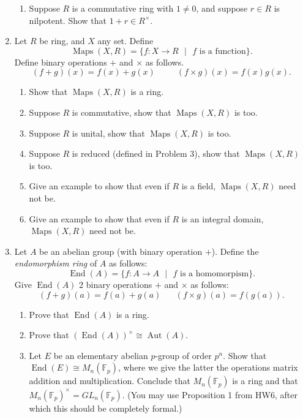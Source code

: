 \documentclass[11pt]{article}
\newcommand{\Aut}{\operatorname{Aut}}
\newcommand{\bF}{\mathbb{F}}
\newcommand{\maps}{\operatorname{Maps}}
\begin{document}
\begin{enumerate}
{\begin{enumerate}
{    }
    \item{
    Suppose $R$ is a commutative ring with $1\not=0$, and suppose $r\in R$ is nilpotent.  Show that $1+r\in R^\times$.
    }
  \end{enumerate}
  }
  \item{
  Let $R$ be ring, and $X$ any set.  Define
  \[\maps(X,R) = \{f:X\to R\text{ }|\text{ }f\text{ is a function}\}.\]
  Define binary operations $+$ and $\times$ as follows.
  \[(f+g)(x) = f(x) + g(x)\hspace{30pt}(f\times g)(x) = f(x)g(x).\]
  \begin{enumerate}
    \item{
    Show that $\maps(X,R)$ is a ring.
    }
    \item{
    Suppose $R$ is commutative, show that $\maps(X,R)$ is too.
    }
    \item{
    Suppose $R$ is unital, show that $\maps(X,R)$ is too.
    }
    \item{
    Suppose $R$ is reduced (defined in Problem 3), show that $\maps(X,R)$ is too.
    }
    \item{
    Give an example to show that even if $R$ is a field, $\maps(X,R)$ need not be.
    }
    \item{
    Give an example to show that even if $R$ is an integral domain, $\maps(X,R)$ need not be.
    }
  \end{enumerate}
  }
  \item{
  Let $A$ be an abelian group (with binary operation $+$).  Define the \textit{endomorphism ring} of $A$ as follows:
  \[\operatorname{End}(A) = \{f:A\to A\text{ }|\text{ }f\text{ is a homomorpism}\}.\]
  Give $\operatorname{End}(A)$ 2 binary operations $+$ and $\times$ as follows:
  \[(f+g)(a) = f(a)+g(a)\hspace{20pt}(f\times g)(a) = f(g(a)).\]
  \begin{enumerate}
    \item{
    Prove that $\operatorname{End}(A)$ is a ring.
    }
    \item{
    Prove that $(\operatorname{End}(A))^\times\cong\Aut(A)$.
    }
    \item{
    Let $E$ be an elementary abelian $p$-group of order $p^n$.  Show that $\operatorname{End}(E)\cong M_n(\bF_p)$, where we give the latter the operations matrix addition and multiplication.  Conclude that $M_n(\bF_p)$ is a ring and that $M_n(\bF_p)^\times = GL_n(\bF_p)$.  (You may use Proposition 1 from HW6, after which this should be completely formal.)
    }
  \end{enumerate}
  }
\end{enumerate}
\end{document}
